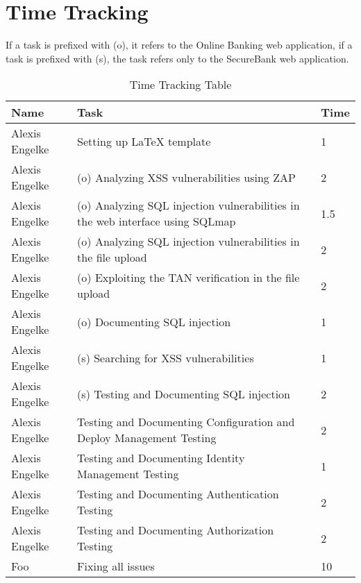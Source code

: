 \chapter{Time Tracking}\label{chapter:times}

If a task is prefixed with (o), it refers to the Online Banking web application, if a task is prefixed with (s), the task refers only to the SecureBank web application.

\begin{table}[htpb]
  \caption[Time Tracking Table]{Time Tracking Table}\label{tab:times}
  \centering
  \begin{tabular}{l p{8cm} l}
    \toprule
      Name & Task & Time \\
    \midrule
      Alexis Engelke & Setting up LaTeX template & 1 \\
      Alexis Engelke & (o) Analyzing XSS vulnerabilities using ZAP & 2 \\
      Alexis Engelke & (o) Analyzing SQL injection vulnerabilities in the web interface using SQLmap & 1.5 \\
      Alexis Engelke & (o) Analyzing SQL injection vulnerabilities in the file upload & 2 \\
      Alexis Engelke & (o) Exploiting the TAN verification in the file upload & 2 \\
      Alexis Engelke & (o) Documenting SQL injection & 1 \\
      Alexis Engelke & (s) Searching for XSS vulnerabilities & 1 \\
      Alexis Engelke & (s) Testing and Documenting SQL injection & 2 \\
      Alexis Engelke & Testing and Documenting Configuration and Deploy Management Testing & 2 \\
      Alexis Engelke & Testing and Documenting Identity Management Testing & 1 \\
      Alexis Engelke & Testing and Documenting Authentication Testing & 2 \\
      Alexis Engelke & Testing and Documenting Authorization Testing & 2 \\
      Foo & Fixing all issues & 10 \\
    \bottomrule
  \end{tabular}
\end{table}
